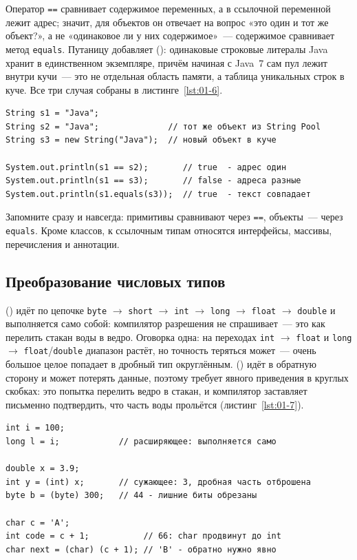 Оператор \texttt{==} сравнивает содержимое переменных, а в ссылочной переменной
лежит адрес; значит, для объектов он отвечает на вопрос «это один и тот же
объект?», а не «одинаковое ли у них содержимое»~--- содержимое сравнивает метод
\texttt{equals}. Путаницу добавляет  ():
одинаковые строковые литералы Java хранит в единственном экземпляре, причём
начиная с Java~7 сам пул лежит внутри кучи~--- это не отдельная область памяти,
а таблица уникальных строк в куче. Все три случая собраны в
листинге~\ref{lst:01-6}.

\begin{listing}[H]
\begin{verbatim}
String s1 = "Java";
String s2 = "Java";              // тот же объект из String Pool
String s3 = new String("Java");  // новый объект в куче

System.out.println(s1 == s2);       // true  - адрес один
System.out.println(s1 == s3);       // false - адреса разные
System.out.println(s1.equals(s3));  // true  - текст совпадает
\end{verbatim}
\caption{Сравнение строк: == и equals}
\label{lst:01-6}
\end{listing}

Запомните сразу и навсегда: примитивы сравнивают через \texttt{==}, объекты~---
через \texttt{equals}. Кроме классов, к ссылочным типам относятся интерфейсы,
массивы, перечисления и аннотации.

\subsection{Преобразование числовых типов}

 () идёт по цепочке
\texttt{byte} $\to$ \texttt{short} $\to$ \texttt{int} $\to$ \texttt{long} $\to$
\texttt{float} $\to$ \texttt{double} и выполняется само собой: компилятор
разрешения не спрашивает~--- это как перелить стакан воды в ведро. Оговорка
одна: на переходах \texttt{int} $\to$ \texttt{float} и \texttt{long} $\to$
\texttt{float}/\texttt{double} диапазон растёт, но точность теряться может~---
очень большое целое попадает в дробный тип округлённым.  () идёт в обратную сторону и может потерять
данные, поэтому требует явного приведения в круглых скобках: это попытка
перелить ведро в стакан, и компилятор заставляет письменно подтвердить, что
часть воды прольётся (листинг~\ref{lst:01-7}).

\begin{listing}[H]
\begin{verbatim}
int i = 100;
long l = i;            // расширяющее: выполняется само

double x = 3.9;
int y = (int) x;       // сужающее: 3, дробная часть отброшена
byte b = (byte) 300;   // 44 - лишние биты обрезаны

char c = 'A';
int code = c + 1;           // 66: char продвинут до int
char next = (char) (c + 1); // 'B' - обратно нужно явно
\end{verbatim}
\caption{Расширяющее и сужающее преобразования}
\label{lst:01-7}
\end{listing}

